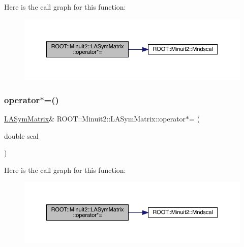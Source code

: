 Here is the call graph for this function\+:
\nopagebreak
\begin{figure}[H]
\begin{center}
\leavevmode
\includegraphics[width=350pt]{d3/d72/classROOT_1_1Minuit2_1_1LASymMatrix_abb10e4e092df8072bf59de3a0880b336_cgraph}
\end{center}
\end{figure}
\mbox{\label{classROOT_1_1Minuit2_1_1LASymMatrix_abb10e4e092df8072bf59de3a0880b336}} 
\subsubsection{\texorpdfstring{operator$\ast$=()}{operator*=()}\hspace{0.1cm}{\footnotesize\ttfamily [2/2]}}
{\footnotesize\ttfamily \mbox{\hyperlink{classROOT_1_1Minuit2_1_1LASymMatrix}{L\+A\+Sym\+Matrix}}\& R\+O\+O\+T\+::\+Minuit2\+::\+L\+A\+Sym\+Matrix\+::operator$\ast$= (\begin{DoxyParamCaption}\item[{double}]{scal }\end{DoxyParamCaption})\hspace{0.3cm}{\ttfamily [inline]}}

Here is the call graph for this function\+:
\nopagebreak
\begin{figure}[H]
\begin{center}
\leavevmode
\includegraphics[width=350pt]{d3/d72/classROOT_1_1Minuit2_1_1LASymMatrix_abb10e4e092df8072bf59de3a0880b336_cgraph}
\end{center}
\end{figure}
\mbox{\label{classROOT_1_1Minuit2_1_1LASymMatrix_a36e303de732b9277e57d27f91bb0d56a}} 
